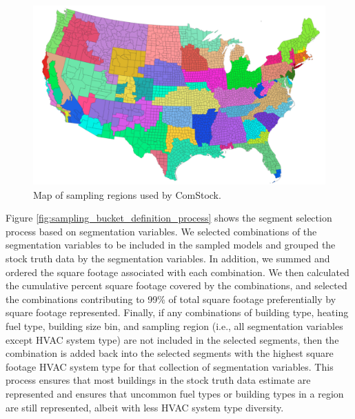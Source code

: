 \begin{figure}[hbt!]
  \centering \includegraphics[width=1\textwidth]{figures/sampling_regions.png}
  \caption{Map of sampling regions used by ComStock.}
   \label{fig:sampling_regions}
\end{figure}



Figure \ref{fig:sampling_bucket_definition_process} shows the segment selection process based on segmentation variables. We selected combinations of the segmentation variables to be included in the sampled models and grouped the stock truth data by the segmentation variables. In addition, we summed and ordered the square footage associated with each combination. We then calculated the cumulative percent square footage covered by the combinations, and selected the combinations contributing to 99\% of total square footage preferentially by square footage represented. Finally, if any combinations of building type, heating fuel type, building size bin, and sampling region (i.e., all segmentation variables except HVAC system type) are not included in the selected segments, then the combination is added back into the selected segments with the highest square footage HVAC system type for that collection of segmentation variables. This process ensures that most buildings in the stock truth data estimate are represented and ensures that uncommon fuel types or building types in a region are still represented, albeit with less HVAC system type diversity.

